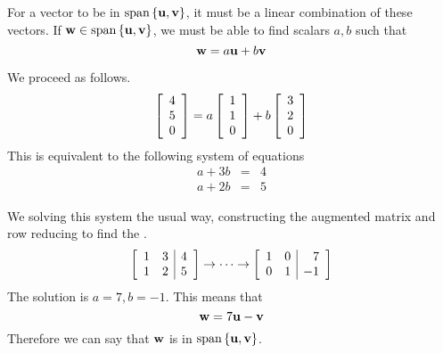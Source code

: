 \begin{solution}
For a vector to be in $\mbox{span} \left\{ {\bf u}, {\bf v} \right\}$, it must be a linear combination of these vectors. If ${\bf w} \in \mbox{span} \left\{ {\bf u}, {\bf v} \right\}$, we must be able to find scalars $a,b$ such that\[
{\bf w} = a {\bf u} +b {\bf v}
\]

We proceed as follows.
\[
\left[ \begin{array}{r}
4 \\
5 \\
0
\end{array}
\right]
=
a 
\left[ \begin{array}{r}
1 \\
1 \\
0
\end{array}
\right]
+
b
\left[ \begin{array}{r}
3 \\
2 \\
0
\end{array}
\right]
\]
This is equivalent to the following system of equations
\begin{eqnarray*}
a + 3b &=& 4 \\
a + 2b &=& 5
\end{eqnarray*}

We solving this system the usual way, constructing the augmented matrix and row reducing to find the {\rref}.
\[
\left[ \begin{array}{rr|r}
1 & 3 & 4 \\
1 & 2 & 5 
\end{array}
\right]
\rightarrow \cdots \rightarrow
\left[ \begin{array}{rr|r}
1 & 0 & 7 \\
0 & 1 & -1
\end{array}
\right]
\]
The solution is $a=7, b=-1$. This means that 
\[
{\bf w} = 7 {\bf u} - {\bf v}
\] 
Therefore we can say that ${\bf w}$ is in $\mbox{span} \left\{ {\bf u}, {\bf v} \right\}$. 
\end{solution}
